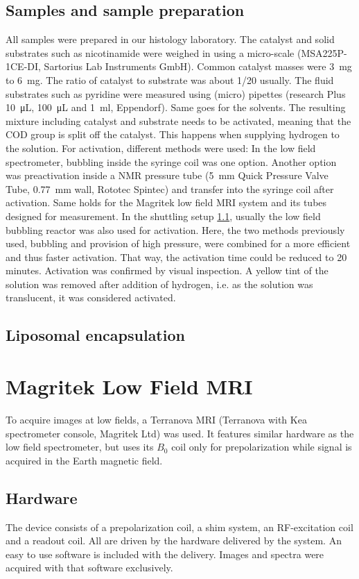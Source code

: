         \subsection{Samples and sample preparation}
        All samples were prepared in our histology laboratory. The catalyst and solid substrates such as nicotinamide were weighed in using a micro-scale (MSA225P-1CE-DI, Sartorius Lab Instruments GmbH). Common catalyst masses were \SI{3}{\milli\gram} to \SI{6}{\milli\gram}. The ratio of catalyst to substrate was about \SI{1/20}{} usually. The fluid substrates such as pyridine were measured using  (micro) pipettes (research Plus \SI{10}{\micro\liter}, \SI{100}{\micro\liter} and \SI{1}{\ml}, Eppendorf). Same goes for the solvents.
        The resulting mixture including catalyst and substrate needs to be activated, meaning that the COD group is split off the catalyst. This happens when supplying hydrogen to the solution. For activation, different methods were used: In the low field spectrometer, bubbling inside the syringe coil was one option. Another option was preactivation inside a NMR pressure tube (\SI{5}{\mm} Quick Pressure Valve Tube, \SI{0.77}{\mm} wall, Rototec Spintec) and transfer into the syringe coil after activation. Same holds for the Magritek low field MRI system and its tubes designed for measurement.
        In the shuttling setup \ref{}, usually the low field bubbling reactor was also used for activation. Here, the two methods previously used, bubbling and provision of high pressure, were combined for a more efficient and thus faster activation. That way, the activation time could be reduced to 20 minutes.
        Activation was confirmed by visual inspection. A yellow tint of the solution was removed after addition of hydrogen, i.e. as the solution was translucent, it was considered activated.
        \subsection{Liposomal encapsulation}
    \section{Magritek Low Field MRI}
    To acquire images at low fields, a Terranova MRI (Terranova with Kea spectrometer console, Magritek Ltd) was used. It features similar hardware as the low field spectrometer, but uses its $B_0$ coil only for prepolarization while signal is acquired in the Earth magnetic field.
        \subsection{Hardware}
            The device consists of a prepolarization coil, a shim system, an RF-excitation coil and a readout coil. All are driven by the hardware delivered by the system. An easy to use software is included with the delivery. Images and spectra were acquired with that software exclusively.
